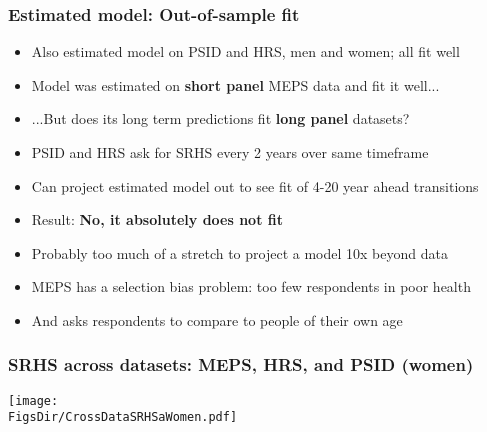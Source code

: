 \documentclass[aspectratio=169]{beamer}
\newcommand{\FigsDir}{../Figures}
\begin{document}
\begin{frame}\frametitle{Estimated model: Out-of-sample fit}
\begin{itemize}
\item <1->Also estimated model on PSID and HRS, men and women; all fit well

\item <1->Model was estimated on \textbf{short panel} MEPS data and fit it well...

\item <1->...But does its long term predictions fit \textbf{long panel} datasets?

\item <2->PSID and HRS ask for SRHS every 2 years over same timeframe

\item <2->Can project estimated model out to see fit of 4-20 year ahead transitions

\item <3->Result: \textbf{No, it absolutely does not fit}

\item <4->Probably too much of a stretch to project a model 10x beyond data

\item <4->MEPS has a selection bias problem: too few respondents in poor health

\item <4->And asks respondents to compare to people of their own age
\end{itemize}
\end{frame}



\begin{frame}\frametitle{SRHS across datasets: MEPS, HRS, and PSID (women)}
\begin{center}
	\texttt{[image: \\FigsDir/CrossDataSRHSaWomen.pdf]}
\end{center}
\end{frame}
\end{document}
